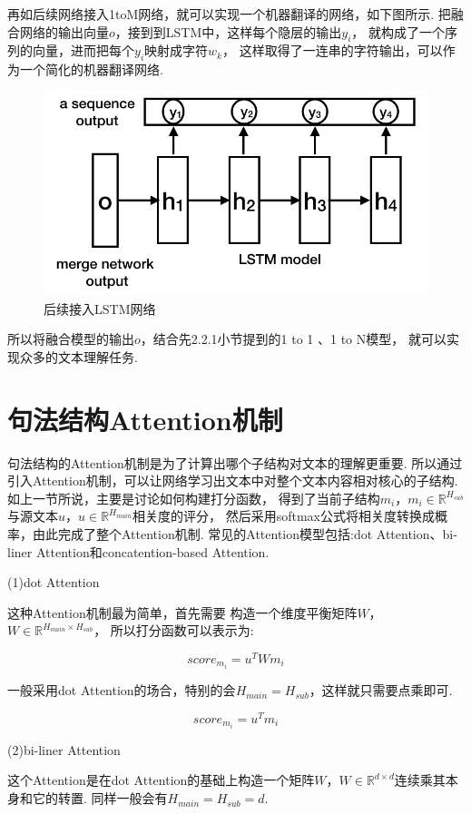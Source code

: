 \documentclass[bachelor,adobefonts]{jnuthesis}
\begin{document}
再如后续网络接入1toM网络，就可以实现一个机器翻译的网络，如下图所示.
把融合网络的输出向量$o$，接到到LSTM中，这样每个隐层的输出$y_{i}$，
就构成了一个序列的向量，进而把每个$y_{i}$映射成字符$w_{k}$，
这样取得了一连串的字符输出，可以作为一个简化的机器翻译网络.

\begin{figure}[h!]
  \centering
  \includegraphics[width=0.5\linewidth]{机器翻译例子.png}
  \caption{后续接入LSTM网络}
\end{figure}

所以将融合模型的输出$o$，结合先2.2.1小节提到的1 to 1 、1 to N模型，
就可以实现众多的文本理解任务. 

\section{句法结构Attention机制}
句法结构的Attention机制是为了计算出哪个子结构对文本的理解更重要.
所以通过引入Attention机制，可以让网络学习出文本中对整个文本内容相对核心的子结构.
如上一节所说，主要是讨论如何构建打分函数，
得到了当前子结构$m_{i}$，$m_{i} \in \mathbb{R}^{H_{sub}}$与源文本$u$，$u \in \mathbb{R}^{H_{main}}$相关度的评分，
然后采用softmax公式将相关度转换成概率，由此完成了整个Attention机制.
常见的Attention模型包括:dot Attention、bi-liner Attention和concatention-based Attention.

(1)dot Attention

这种Attention机制最为简单，首先需要
构造一个维度平衡矩阵$W$，$W \in \mathbb{R}^{H_{main} \times H_{sub}}$，
所以打分函数可以表示为:

\begin{equation}
  score_{m_{i}} = u^{T}Wm_{i}
\end{equation}

一般采用dot Attention的场合，特别的会$H_{main} = H_{sub}$，这样就只需要点乘即可.

\begin{equation}
  score_{m_{i}} = u^{T}m_{i}
\end{equation}

(2)bi-liner Attention

这个Attention是在dot Attention的基础上构造一个矩阵$W$，$W \in \mathbb{R}^{d \times d}$连续乘其本身和它的转置.
同样一般会有$H_{main} = H_{sub} = d $.
\end{document}
